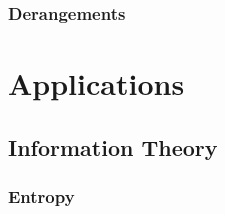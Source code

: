 \documentclass[11pt]{report} %
\begin{document}
\section{Derangements}

\part{Applications}

\chapter{Information Theory}

\section{Entropy}
\end{document}
